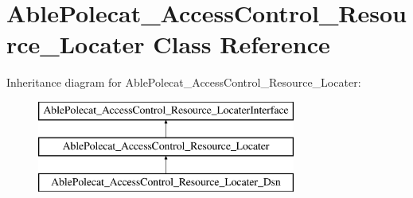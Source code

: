 \hypertarget{class_able_polecat___access_control___resource___locater}{}\section{Able\+Polecat\+\_\+\+Access\+Control\+\_\+\+Resource\+\_\+\+Locater Class Reference}
\label{class_able_polecat___access_control___resource___locater}
Inheritance diagram for Able\+Polecat\+\_\+\+Access\+Control\+\_\+\+Resource\+\_\+\+Locater\+:\begin{figure}[H]
\begin{center}
\leavevmode
\includegraphics[height=3.000000cm]{class_able_polecat___access_control___resource___locater}
\end{center}
\end{figure}
